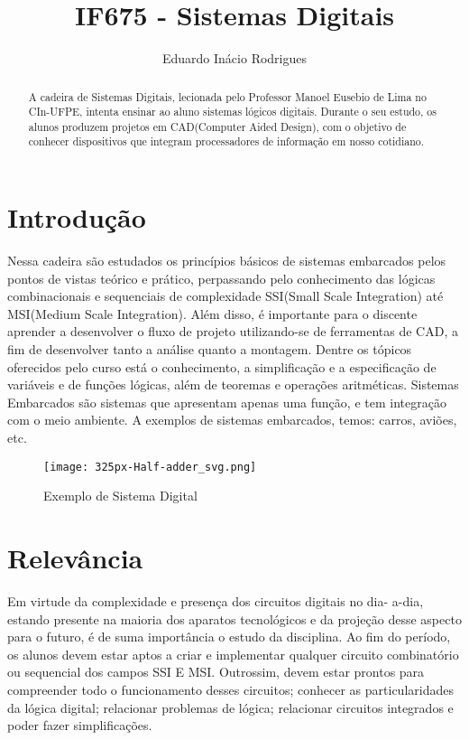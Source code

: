 \documentclass[a4paper]{article}
\title{IF675 - Sistemas Digitais }
\author{Eduardo Inácio Rodrigues}
\begin{document}
\maketitle
\begin{abstract}
A cadeira de Sistemas Digitais, lecionada pelo Professor Manoel Eusebio de Lima no CIn-UFPE, intenta ensinar ao aluno sistemas lógicos digitais. Durante o seu estudo, os alunos produzem projetos em CAD(Computer Aided Design), com o objetivo de conhecer dispositivos que integram processadores de informação em nosso cotidiano. 
\end{abstract}
\section*{Introdução}
Nessa cadeira são estudados os princípios básicos de sistemas embarcados
pelos pontos de vistas teórico e prático, perpassando pelo conhecimento das lógicas
combinacionais e sequenciais de complexidade SSI(Small Scale Integration) até MSI(Medium Scale Integration). Além disso, é importante
para o discente aprender a desenvolver o fluxo de projeto utilizando-se de
ferramentas de CAD, a fim de desenvolver tanto a análise quanto a montagem. Dentre os tópicos oferecidos pelo
curso está o conhecimento, a simplificação e a especificação de variáveis e de funções
lógicas, além de teoremas e operações aritméticas. Sistemas Embarcados são sistemas que apresentam apenas uma função, e tem integração com o meio ambiente. A exemplos de sistemas embarcados, temos: carros, aviões, etc.
\begin{figure} [H]
\centering
\texttt{[image: 325px-Half-adder\_svg.png]} 
\caption{\label{fig:frog}Exemplo de Sistema Digital}
\end{figure}

\section*{Relevância}
Em virtude da complexidade e presença dos circuitos digitais no dia-
a-dia, estando presente na maioria dos aparatos tecnológicos e da projeção desse
aspecto para o futuro, é de suma importância o estudo da disciplina. Ao fim do
período, os alunos devem estar aptos a criar e implementar qualquer circuito
combinatório ou sequencial dos campos SSI E MSI. Outrossim, devem estar prontos
para compreender todo o funcionamento desses circuitos; conhecer as
particularidades da lógica digital; relacionar problemas de lógica; relacionar circuitos
integrados e poder fazer simplificações.
\linebreak
\end{document}
